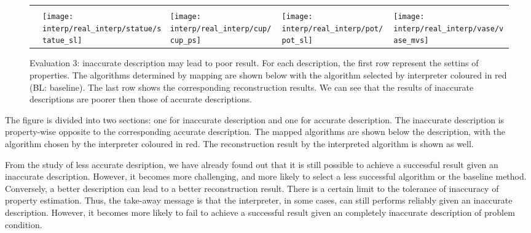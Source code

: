 \begin{figure}[!htbp]
\begin{tabular}{c|*{4}{l}}
& 					& 				   & \tabitem\tc{GSL}	& \\
& \texttt{[image: interp/real\_interp/statue/statue\_sl]}
& \texttt{[image: interp/real\_interp/cup/cup\_ps]}
& \texttt{[image: interp/real\_interp/pot/pot\_sl]}
& \texttt{[image: interp/real\_interp/vase/vase\_mvs]} \\
\bottomrule
\end{tabular}
\caption{Evaluation 3: inaccurate description may lead to poor result. For each description, the first row represent the settins of properties. The algorithms determined by mapping are shown below with the algorithm selected by interpreter coloured in red (BL: baseline). The last row shows the corresponding reconstruction results. We can see that the results of inaccurate descriptions are poorer then those of accurate descriptions.}
\label{fig:eval_3}
\end{figure}

The figure is divided into two sections: one for inaccurate description and one for accurate description. The inaccurate description is property-wise opposite to the corresponding accurate description. The mapped algorithms are shown below the description, with the algorithm chosen by the interpreter coloured in red. The reconstruction result by the interpreted algorithm is shown as well.

From the study of less accurate desription, we have already found out that it is still possible to achieve a successful result given an inaccurate description. However, it becomes more challenging, and more likely to select a less successful algorithm or the baseline method. Conversely, a better description can lead to a better reconstruction result. There is a certain limit to the tolerance of inaccuracy of property estimation. Thus, the take-away message is that the interpreter, in some cases, can still performs reliably given an inaccurate description. However, it becomes more likely to fail to achieve a successful result given an completely inaccurate description of problem condition.


